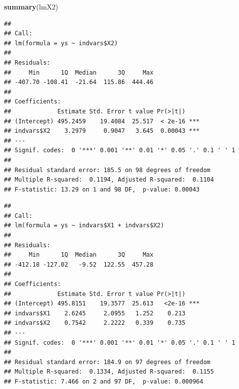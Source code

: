 \documentclass[
]{book}
\newenvironment{Shaded}{\begin{snugshade}}{\end{snugshade}}
\newcommand{\CommentTok}[1]{\textcolor[rgb]{0.56,0.35,0.01}{\textit{#1}}}
\newcommand{\FunctionTok}[1]{\textcolor[rgb]{0.13,0.29,0.53}{\textbf{#1}}}
\newcommand{\NormalTok}[1]{#1}
\newcommand{\OtherTok}[1]{\textcolor[rgb]{0.56,0.35,0.01}{#1}}
\newcommand{\SpecialCharTok}[1]{\textcolor[rgb]{0.81,0.36,0.00}{\textbf{#1}}}
\begin{document}
\begin{Shaded}
\begin{Highlighting}[]
\FunctionTok{summary}\NormalTok{(lmX2)}
\end{Highlighting}
\end{Shaded}

\begin{verbatim}
## 
## Call:
## lm(formula = ys ~ indvars$X2)
## 
## Residuals:
##     Min      1Q  Median      3Q     Max 
## -407.70 -108.41  -21.64  115.86  444.46 
## 
## Coefficients:
##             Estimate Std. Error t value Pr(>|t|)    
## (Intercept) 495.2459    19.4084  25.517  < 2e-16 ***
## indvars$X2    3.2979     0.9047   3.645  0.00043 ***
## ---
## Signif. codes:  0 '***' 0.001 '**' 0.01 '*' 0.05 '.' 0.1 ' ' 1
## 
## Residual standard error: 185.5 on 98 degrees of freedom
## Multiple R-squared:  0.1194, Adjusted R-squared:  0.1104 
## F-statistic: 13.29 on 1 and 98 DF,  p-value: 0.00043
\end{verbatim}

\begin{Shaded}
\end{Shaded}

\begin{verbatim}
## 
## Call:
## lm(formula = ys ~ indvars$X1 + indvars$X2)
## 
## Residuals:
##     Min      1Q  Median      3Q     Max 
## -412.18 -127.02   -9.52  122.55  457.28 
## 
## Coefficients:
##             Estimate Std. Error t value Pr(>|t|)    
## (Intercept) 495.8151    19.3577  25.613   <2e-16 ***
## indvars$X1    2.6245     2.0955   1.252    0.213    
## indvars$X2    0.7542     2.2222   0.339    0.735    
## ---
## Signif. codes:  0 '***' 0.001 '**' 0.01 '*' 0.05 '.' 0.1 ' ' 1
## 
## Residual standard error: 184.9 on 97 degrees of freedom
## Multiple R-squared:  0.1334, Adjusted R-squared:  0.1155 
## F-statistic: 7.466 on 2 and 97 DF,  p-value: 0.000964
\end{verbatim}

\begin{Shaded}
\end{Shaded}
\end{document}
